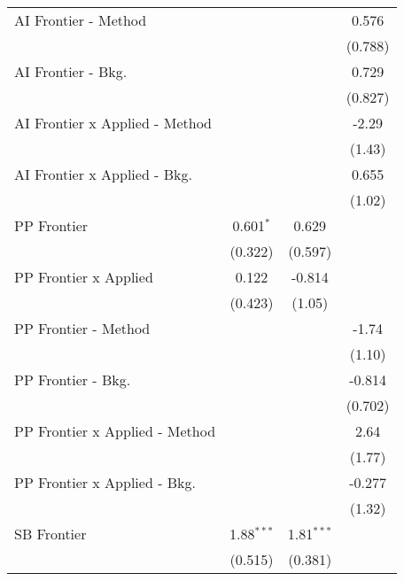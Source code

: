\begin{tabular}{lccc}
   AI Frontier - Method           &               &               & 0.576\\   
                                  &               &               & (0.788)\\   
   AI Frontier - Bkg.             &               &               & 0.729\\   
                                  &               &               & (0.827)\\   
   AI Frontier x Applied - Method &               &               & -2.29\\   
                                  &               &               & (1.43)\\   
   AI Frontier x Applied - Bkg.   &               &               & 0.655\\   
                                  &               &               & (1.02)\\   
   PP Frontier                    & 0.601$^{*}$   & 0.629         &   \\   
                                  & (0.322)       & (0.597)       &   \\   
   PP Frontier x Applied          & 0.122         & -0.814        &   \\   
                                  & (0.423)       & (1.05)        &   \\   
   PP Frontier - Method           &               &               & -1.74\\   
                                  &               &               & (1.10)\\   
   PP Frontier - Bkg.             &               &               & -0.814\\   
                                  &               &               & (0.702)\\   
   PP Frontier x Applied - Method &               &               & 2.64\\   
                                  &               &               & (1.77)\\   
   PP Frontier x Applied - Bkg.   &               &               & -0.277\\   
                                  &               &               & (1.32)\\   
   SB Frontier                    & 1.88$^{***}$  & 1.81$^{***}$  &   \\   
                                  & (0.515)       & (0.381)       &   \\   

\end{tabular}
